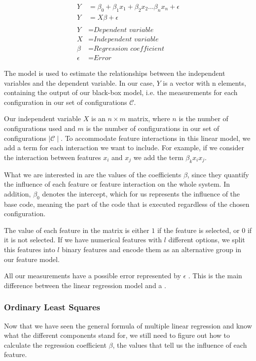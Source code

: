 \begin{align}\label{formula:linReg}
    Y &= \beta_0 + \beta_1 x_1 + \beta_2 x_2 ... \beta_n x_n + \epsilon   \\
    Y &= X \beta + \epsilon \nonumber\\ \nonumber \\ \nonumber
    Y &= \textit{Dependent variable}\\ \nonumber
    X &= \textit{Independent variable}\\ \nonumber
    \beta &= \textit{Regression coefficient}\\ \nonumber
    \epsilon &= \textit{Error} \nonumber
\end{align}

The model is used to estimate the relationships between the independent variables and the dependent variable.
In our case, $Y$ is a vector with n elements, containing the output of our black-box model, 
i.e. the measurements for each configuration in our set of configurations $\mathcal{C}$. 

Our independent variable $X$ is an $n \times m$ matrix, where $n$ is the number of configurations used and $m$ is the number of configurations
in our set of configurations $\mid \mathcal{C} \mid$.
To accommodate feature interactions in this linear model, we add a term for each interaction we want to include. For example,
if we consider the interaction between features $x_i$ and $x_j$ we add the term $\beta_k x_i x_j$. 

What we are interested in are the values of the coefficients $\beta$, since they quantify the influence of each feature or feature interaction
on the whole system. In addition, $\beta_0$ denotes the intercept, which for us represents the influence of the base code, meaning
the part of the code that is executed regardless of the chosen configuration.

The value of each feature in the matrix is either $1$ if the feature is selected, or $0$ if it is not selected. 
If we have numerical features with $l$ different options,
we split this features into $l$ binary features and encode them as an alternative group in our feature model.

All our measurements have a possible error represented by $\epsilon$ \cite{Linear-Regression}. This is the main difference
between the linear regression model and a \perfInfluenceModel.

\subsubsection{Ordinary Least Squares}
Now that we have seen the general formula of multiple linear regression and know what the different components stand for, we still need to figure out 
how to calculate the regression coefficient $\beta$, the values that tell us the influence of each feature. 

